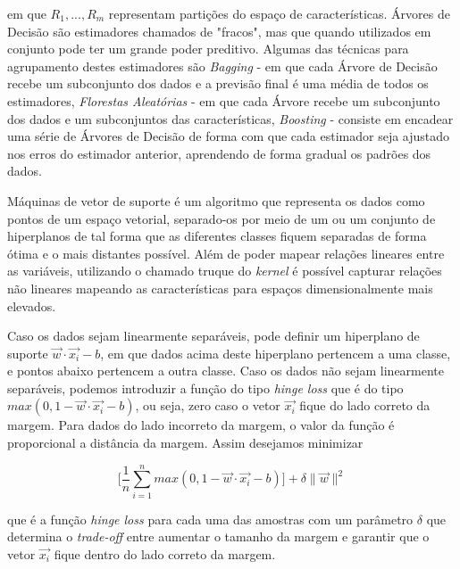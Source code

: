 \documentclass[twocolumn]{rbef}
\newcommand{\1}{\mathbbm{1}}
\begin{document}
em que $R_{1}, ..., R_{m}$ representam partições do espaço de características. Árvores de Decisão são estimadores chamados de "fracos", mas que quando utilizados em conjunto pode ter um grande poder preditivo. Algumas das técnicas para agrupamento destes estimadores são \textit{Bagging}\cite{BreimanBag} - em que cada Árvore de Decisão recebe um subconjunto dos dados e a previsão final é uma média de todos os estimadores, \textit{Florestas Aleatórias}\cite{BreimanRF} - em que cada Árvore recebe um subconjunto dos dados e um subconjuntos das características, \textit{Boosting}\cite{BreimanB} - consiste em encadear uma série de Árvores de Decisão de forma com que cada estimador seja ajustado nos erros do estimador anterior, aprendendo de forma gradual os padrões dos dados.

Máquinas de vetor de suporte é um algoritmo que representa os dados como pontos de um espaço vetorial, separado-os por meio de um ou um conjunto de hiperplanos de tal forma que as diferentes classes fiquem separadas de forma ótima e o mais distantes possível\cite{Cortes}. Além de poder mapear relações lineares entre as variáveis, utilizando o chamado truque do \textit{kernel}\cite{Aizerman} é possível capturar relações não lineares mapeando as características para espaços dimensionalmente mais elevados.

Caso os dados sejam linearmente separáveis, pode definir um hiperplano de suporte $\vec{w} \cdot \vec{x_i} - b$, em que dados acima deste hiperplano pertencem a uma classe, e pontos abaixo pertencem a outra classe. Caso os dados não sejam linearmente separáveis, podemos introduzir a função do tipo \textit{hinge loss} que é do tipo $max(0, 1 - \vec{w} \cdot \vec{x_i} - b)$, ou seja, zero caso o vetor $\vec{x_{i}}$ fique do lado correto da margem. Para dados do lado incorreto da margem, o valor da função é proporcional a distância da margem. Assim desejamos minimizar

\begin{equation}
    \Bigg[ \frac{1}{n} \sum_{i=1}^{n} max(0, 1 - \vec{w} \cdot \vec{x_i} - b) \Bigg] + \delta \|\vec{w}\|^2
\end{equation}

que é a função \textit{hinge loss} para cada uma das amostras com um parâmetro $\delta$ que determina o \textit{trade-off} entre aumentar o tamanho da margem e garantir que o vetor $\vec{x_{i}}$ fique dentro do lado correto da margem.
\end{document}
